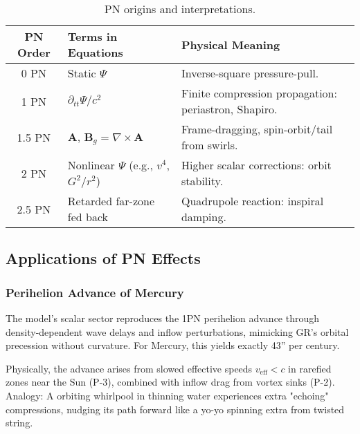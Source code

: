 \documentclass{article}
\begin{document}
\begin{table}[h!]
\centering
\begin{tabular}{|c|l|l|}
\hline
PN Order & Terms in Equations & Physical Meaning \\
\hline
0 PN & Static $\Psi$ & Inverse-square pressure-pull. \\
1 PN & $\partial_{tt} \Psi / c^2$ & Finite compression propagation: periastron, Shapiro. \\
1.5 PN & $\mathbf{A}$, $\mathbf{B}_g = \nabla \times \mathbf{A}$ & Frame-dragging, spin-orbit/tail from swirls. \\
2 PN & Nonlinear $\Psi$ (e.g., $v^4$, $G^2 / r^2$) & Higher scalar corrections: orbit stability. \\
2.5 PN & Retarded far-zone fed back & Quadrupole reaction: inspiral damping. \\
\hline
\end{tabular}
\caption{PN origins and interpretations.}
\end{table}

\subsection{Applications of PN Effects}

\subsubsection{Perihelion Advance of Mercury}

The model's scalar sector reproduces the 1PN perihelion advance through density-dependent wave delays and inflow perturbations, mimicking GR's orbital precession without curvature. For Mercury, this yields exactly 43'' per century.

Physically, the advance arises from slowed effective speeds $v_{\text{eff}} < c$ in rarefied zones near the Sun (P-3), combined with inflow drag from vortex sinks (P-2). Analogy: A orbiting whirlpool in thinning water experiences extra "echoing" compressions, nudging its path forward like a yo-yo spinning extra from twisted string.
\end{document}
